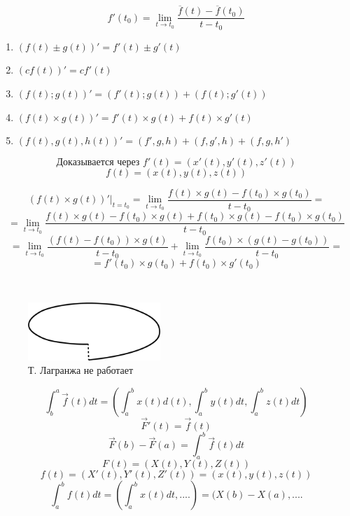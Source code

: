 \documentclass[main]{subfiles}
\begin{document}
    \begin{Definition}
    	\[f'(t_0) = \lim_{t \to t_0} \frac{ \overline{f}(t) - \overline{f}(t_0)}{t - t_0}\]
    \end{Definition}

    \begin{theorem} [свойства]
    		\begin{enumerate}
    			\item $(f(t) \pm g(t))' = f'(t) \pm g'(t)$
    			\item $(c f(t))' = cf'(t)$
    			\item $(f(t); g(t))' = (f'(t); g(t)) + (f(t); g'(t))$
    			\item $(f(t) \times g(t))' = f'(t) \times g(t) + f(t) \times g'(t)$
    			\item $(f(t), g(t), h(t))' = (f', g, h) + (f, g', h) + (f, g, h')$
    		\end{enumerate}
    \end{theorem}

    \begin{Remark}
        \[\text{Доказывается через }f'(t) = (x'(t), y'(t), z'(t))\]
        \[f(t) = (x(t), y(t), z(t))\]
    \end{Remark}

    \begin{Proof}[ВП]
        \[(f(t) \times g(t))'|_{t = t_0} = \lim_{t \to t_0} \frac{f(t) \times g(t) - f(t_0) \times g(t_0)}{t - t_0} = \]
        \[= \lim_{t \to t_0} \frac{f(t) \times g(t) - f(t_0) \times g(t) + f(t_0) \times g(t) - f(t_0) \times g(t_0)}{t - t_0}\]
        \[= \lim_{t \to t_0} \frac{(f(t) - f(t_0)) \times g(t)}{t - t_0} +
        \lim_{t \to t_0} \frac{f(t_0) \times (g(t) - g(t_0))}{t - t_0} = \]
        \[= f'(t_0) \times g(t_0) + f(t_0) \times g'(t_0)\]
    \end{Proof}

    \begin{example}[контрпример]\
            \begin{figure}[H]
                \includegraphics[width=5cm]{pics/1_2}
                \centering
                \caption{Т. Лагранжа не работает}
            \end{figure}
            \[\int_b^a \overrightarrow{f}(t) dt = (\int_a^b x(t)d(t), \int_a^b y(t)dt, \int_a^b z(t)dt) \]
            \[\overrightarrow{F}'(t) = \overrightarrow{f}(t)\]
            \[\overrightarrow{F}(b) - \overrightarrow{F}(a) = \int_a^b \overrightarrow{f}(t)dt\]
            \[F(t) = (X(t), Y(t), Z(t))\]
            \[f(t) = (X'(t), Y'(t), Z'(t)) = (x(t), y(t), z(t))\]
            \[\int_a^b f(t)dt = (\int_a^b x(t) dt, ....) = (X(b) - X(a), ....\]
    \end{example}
\end{document}
